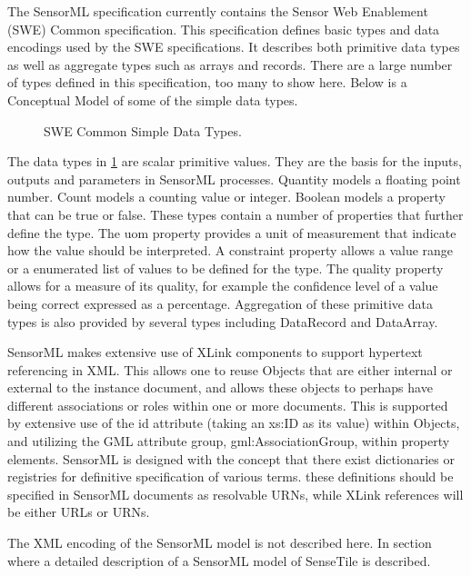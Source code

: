 \documentclass[]{final_report}
\begin{document}
The SensorML specification currently contains the Sensor Web Enablement (SWE) Common specification. This specification defines basic types and data encodings used by the SWE specifications. It describes both primitive data types as well as aggregate types such as arrays and records. There are a large number of types defined in this specification, too many to show here. Below is a Conceptual Model of some of the simple data types.

\begin{figure}[h]
\caption{SWE Common Simple Data Types.}\label{fig:SWESimpleConceptualModel}
\end{figure}

The data types in \ref{fig:SWESimpleConceptualModel} are scalar primitive values. They are the basis for the inputs, outputs and parameters in SensorML processes. Quantity models a floating point number. Count models a counting value or integer.  Boolean models a property that can be true or false. These types contain a number of properties that further define the type. The uom property provides a unit of measurement that indicate how the value should be interpreted.  A constraint property allows a value range or a enumerated list of values to be defined for the type. The quality property allows for a measure of its quality, for example the confidence level of a value being correct expressed as a percentage. Aggregation of these primitive data types is also provided by several types including DataRecord and DataArray.

SensorML makes extensive use of XLink components to support hypertext referencing in XML. This allows one to reuse Objects that are either internal or external to the instance document, and allows these objects to perhaps have different associations or roles within one or more documents. This is supported by extensive use of the id attribute (taking an xs:ID as its value) within Objects, and utilizing the GML attribute group, gml:AssociationGroup, within property elements.
SensorML is designed with the concept that there exist dictionaries or registries for definitive specification of various terms.
these definitions should be specified in SensorML documents as resolvable URNs, while XLink references will be either URLs or URNs.

The XML encoding of the SensorML model is not described here. In section where a detailed description of a SensorML model of SenseTile is described.
\end{document}
